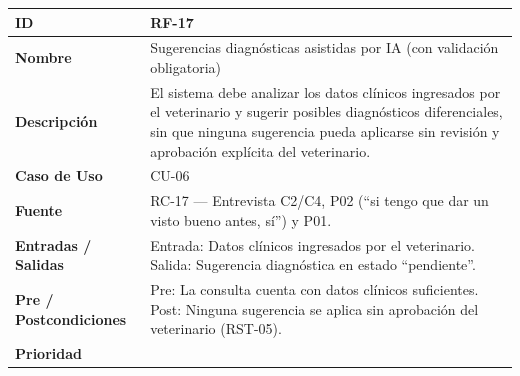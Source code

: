 \documentclass[
]{article}
\newcounter{none} %
\begin{document}
{\def\LTcaptype{none} %
\begin{longtable}[]{|
  >{\raggedright\arraybackslash}p{}|
  >{\raggedright\arraybackslash}p{}|}
\hline
\begin{minipage}[b]{\linewidth}\raggedright
\textbf{ID}
\end{minipage} & \begin{minipage}[b]{\linewidth}\raggedright
RF-17
\end{minipage} \\
\hline
\endhead
\hline
\endlastfoot
\textbf{Nombre} & \begin{minipage}[t]{\linewidth}\raggedright
Sugerencias diagnósticas asistidas por IA (con validación obligatoria)
\end{minipage} \\
\hline
\textbf{Descripción} & \begin{minipage}[t]{\linewidth}\raggedright
El sistema debe analizar los datos clínicos ingresados por el veterinario y sugerir posibles diagnósticos diferenciales, sin que ninguna sugerencia pueda aplicarse sin revisión y aprobación explícita del veterinario.
\end{minipage} \\
\hline
\textbf{Caso de Uso} & \begin{minipage}[t]{\linewidth}\raggedright
CU-06
\end{minipage} \\
\hline
\textbf{Fuente} & \begin{minipage}[t]{\linewidth}\raggedright
RC-17 — Entrevista C2/C4, P02 (“si tengo que dar un visto bueno antes, sí”) y P01.
\end{minipage} \\
\hline
\textbf{Entradas / Salidas} & \begin{minipage}[t]{\linewidth}\raggedright
Entrada: Datos clínicos ingresados por el veterinario. Salida: Sugerencia diagnóstica en estado “pendiente”.
\end{minipage} \\
\hline
\textbf{Pre / Postcondiciones} & \begin{minipage}[t]{\linewidth}\raggedright
Pre: La consulta cuenta con datos clínicos suficientes. Post: Ninguna sugerencia se aplica sin aprobación del veterinario (RST-05).
\end{minipage} \\
\hline
\textbf{Prioridad} & \begin{minipage}[t]{\linewidth}\raggedright

\end{minipage}
\end{longtable}}
\end{document}
